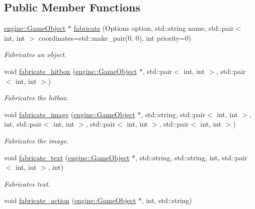 \subsection*{Public Member Functions}
\begin{DoxyCompactItemize}
\item 
\hyperlink{classengine_1_1_game_object}{engine\+::\+Game\+Object} $\ast$ \hyperlink{classmindscape_1_1_game_object_factory_aad9cecdf58a0786aaa33e321ced1038f}{fabricate} (Options option, std\+::string name, std\+::pair$<$ int, int $>$ coordinates=std\+::make\+\_\+pair(0, 0), int priority=0)
\begin{DoxyCompactList}\small\item\em Fabricates an object. \end{DoxyCompactList}\item 
void \hyperlink{classmindscape_1_1_game_object_factory_ae6342abe8f47706db529207ae4488cae}{fabricate\+\_\+hitbox} (\hyperlink{classengine_1_1_game_object}{engine\+::\+Game\+Object} $\ast$, std\+::pair$<$ int, int $>$, std\+::pair$<$ int, int $>$)
\begin{DoxyCompactList}\small\item\em Fabricates the hitbox. \end{DoxyCompactList}\item 
void \hyperlink{classmindscape_1_1_game_object_factory_a2a8f43a73aad02f18e6b09fb5656bd3d}{fabricate\+\_\+image} (\hyperlink{classengine_1_1_game_object}{engine\+::\+Game\+Object} $\ast$, std\+::string, std\+::pair$<$ int, int $>$, int, std\+::pair$<$ int, int $>$, std\+::pair$<$ int, int $>$, std\+::pair$<$ int, int $>$)
\begin{DoxyCompactList}\small\item\em Fabricates the image. \end{DoxyCompactList}\item 
void \hyperlink{classmindscape_1_1_game_object_factory_a6110cb0f4f7a7c0608529087cd6a621f}{fabricate\+\_\+text} (\hyperlink{classengine_1_1_game_object}{engine\+::\+Game\+Object} $\ast$, std\+::string, std\+::string, int, std\+::pair$<$ int, int $>$, int)
\begin{DoxyCompactList}\small\item\em Fabricates text. \end{DoxyCompactList}\item 
void \hyperlink{classmindscape_1_1_game_object_factory_a6872e0a49e1fbc2c0c709f5fd911e2f0}{fabricate\+\_\+action} (\hyperlink{classengine_1_1_game_object}{engine\+::\+Game\+Object} $\ast$, int, std\+::string)

\end{DoxyCompactItemize}
